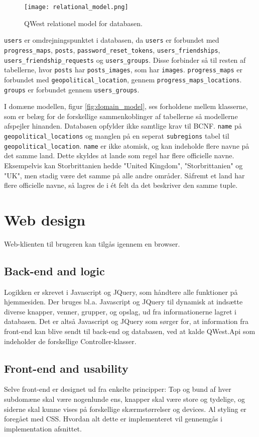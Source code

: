 \begin{figure}
    \texttt{[image: relational\_model.png]}
    \caption{QWest relationel model for databasen.}
    \label{fig:relational_model}
\end{figure}

\texttt{users} er omdrejningspunktet i databasen, da \texttt{users} er forbundet med \texttt{progress\_maps}, \texttt{posts}, \texttt{password\_reset\_tokens}, \texttt{users\_friendships}, \texttt{users\_friendship\_requests} og \texttt{users\_groups}. Disse forbinder så til resten af tabellerne, hvor \texttt{posts} har \texttt{posts\_images}, som har \texttt{images}. \texttt{progress\_maps} er forbundet med \texttt{geopolitical\_location}, gennem \texttt{progress\_maps\_locations}. \texttt{groups} er forbundet gennem \texttt{users\_groups}.

I domæne modellen, figur \ref{fig:domain_model}, ses forholdene mellem klasserne, som er belæg for de forskellige sammenkoblinger af tabellerne så modellerne afspejler hinanden. Databasen opfylder ikke samtlige krav til BCNF\cite{bcnf}. \texttt{name} på \texttt{geopolitical\_locations} og manglen på en seperat \texttt{subregions} tabel til \texttt{geopolitical\_location}. \texttt{name} er ikke atomisk, og kan indeholde flere navne på det samme land. Dette skyldes at lande som regel har flere officielle navne. Eksempelvis kan Storbrittanien hedde "United Kingdom", "Storbrittanien" og "UK", men stadig være det samme på alle andre områder. Såfremt et land har flere officielle navne, så lagres de i ét felt da det beskriver den samme tuple.

\section{Web design}\label{sec:webdesign}
Web-klienten til brugeren kan tilgås igennem en browser. %
\subsection{Back-end and logic}\label{sec:backend}
Logikken er skrevet i Javascript og JQuery, som håndtere alle funktioner på hjemmesiden. Der bruges bl.a. Javascript og JQuery til dynamisk at indsætte diverse knapper, venner, grupper, og opslag, ud fra informationerne lagret i databasen. Det er altså Javascript og JQuery som sørger for, at information fra front-end kan blive sendt til back-end og databasen, ved at kalde QWest.Api som indeholder de forskellige Controller-klasser. %
\subsection{Front-end and usability}\label{sec:frontend}
Selve front-end er designet ud fra enkelte principper: Top og bund af hver subdomæne skal være nogenlunde ens, knapper skal være store og tydelige, og siderne skal kunne vises på forskellige skærmstørrelser og devices. Al styling er foregået med CSS. Hvordan alt dette er implementeret vil gennemgås i implementation afsnittet. %
